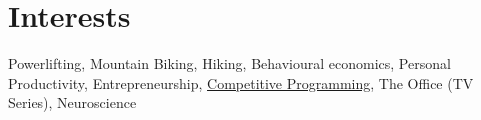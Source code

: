 \documentclass[letterpaper,11pt]{article}
\begin{document}
\section{Interests}
  {Powerlifting, Mountain Biking, Hiking, Behavioural economics, Personal Productivity, Entrepreneurship, \href{https://uhunt.onlinejudge.org/id/64244}{Competitive Programming}, The Office (TV Series), Neuroscience}

\end{document}

